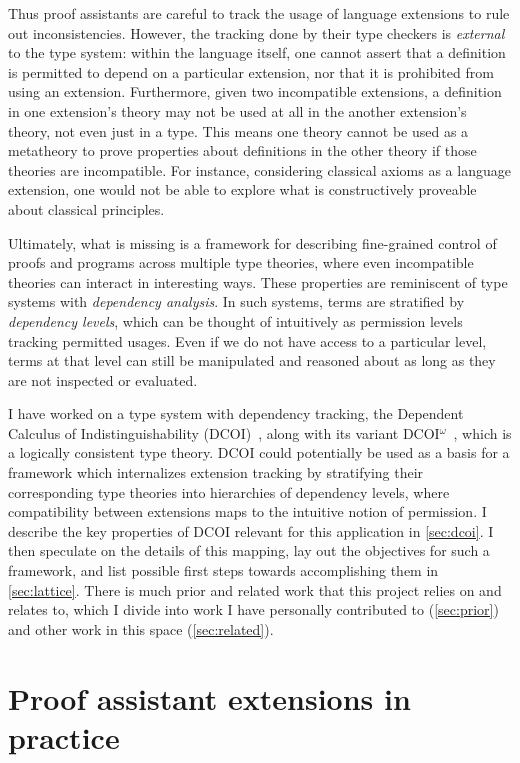 \documentclass{article}
\begin{document}
Thus proof assistants are careful to track
the usage of language extensions to rule out inconsistencies.
However, the tracking done by their type checkers is \emph{external} to the type system:
within the language itself,
one cannot assert that a definition is permitted to depend on a particular extension,
nor that it is prohibited from using an extension.
Furthermore, given two incompatible extensions,
a definition in one extension's theory may not be used at all
in the another extension's theory, not even just in a type.
This means one theory cannot be used as a metatheory
to prove properties about definitions in the other theory
if those theories are incompatible.
For instance, considering classical axioms as a language extension,
one would not be able to explore what is constructively proveable
about classical principles.

Ultimately, what is missing is a framework for describing
fine-grained control of proofs and programs across multiple type theories,
where even incompatible theories can interact in interesting ways.
These properties are reminiscent of type systems with \emph{dependency analysis}.
In such systems, terms are stratified by \emph{dependency levels},
which can be thought of intuitively as permission levels tracking permitted usages.
Even if we do not have access to a particular level,
terms at that level can still be manipulated and reasoned about
as long as they are not inspected or evaluated.

I have worked on a type system with dependency tracking,
the Dependent Calculus of Indistinguishability (DCOI)~\citep{dcoi},
along with its variant DCOI$^\omega$~\citep{dcoi-omega},
which is a logically consistent type theory.
DCOI could potentially be used as a basis for a framework
which internalizes extension tracking by stratifying
their corresponding type theories into hierarchies of dependency levels,
where compatibility between extensions maps to the intuitive notion of permission.
I describe the key properties of DCOI relevant for this application in \cref{sec:dcoi}.
I then speculate on the details of this mapping,
lay out the objectives for such a framework,
and list possible first steps towards accomplishing them in \cref{sec:lattice}.
There is much prior and related work that this project relies on and relates to,
which I divide into work I have personally contributed to (\cref{sec:prior})
and other work in this space (\cref{sec:related}).

\section{Proof assistant extensions in practice} \label{sec:extensions}
\end{document}
